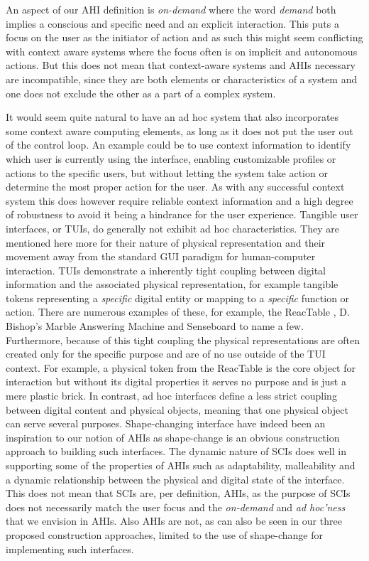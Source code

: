 An aspect of our AHI definition is \emph{on-demand} where the word \emph{demand} both implies a conscious and specific need and an explicit interaction.
This puts a focus on the user as the initiator of action and as such this might seem conflicting with context aware systems where the focus often is on implicit and autonomous actions.
But this does not mean that context-aware systems and AHIs necessary are incompatible, since they are both elements or characteristics of a system and one does not exclude the other as a part of a complex system.

It would seem quite natural to have an ad hoc system that also incorporates some context aware computing elements, as long as it does not put the user out of the control loop.
An example could be to use context information to identify which user is currently using the interface, enabling customizable profiles or actions to the specific users, but without letting the system take action or determine the most proper action for the user.
As with any successful context system this does however require reliable context information and a high degree of robustness to avoid it being a hindrance for the user experience.
\blank
Tangible user interfaces, or TUIs, do generally not exhibit ad hoc characteristics. 
They are mentioned here more for their nature of physical representation and their movement away from the standard GUI paradigm for human-computer interaction.
TUIs demonstrate a inherently tight coupling between digital information and the associated physical representation, for example tangible tokens representing a \emph{specific} digital entity or mapping to a \emph{specific} function or action.
There are numerous examples of these, for example, the ReacTable \cite{jorda2007reactable}, D. Bishop's Marble Answering Machine and Senseboard \cite{jacob2002tangible} to name a few.
Furthermore, because of this tight coupling the physical representations are often created only for the specific purpose and are of no use outside of the TUI context. 
For example, a physical token from the ReacTable is the core object for interaction but without its digital properties it serves no purpose and is just a mere plastic brick.
In contrast, ad hoc interfaces define a less strict coupling between digital content and physical objects, meaning that one physical object can serve several purposes.
\blank
Shape-changing interface have indeed been an inspiration to our notion of AHIs as shape-change is an obvious construction approach to building such interfaces.
The dynamic nature of SCIs does well in supporting some of the properties of AHIs such as adaptability, malleability and a dynamic relationship between the physical and digital state of the interface.
This does not mean that SCIs are, per definition, AHIs, as the purpose of SCIs does not necessarily match the user focus and the \emph{on-demand} and \emph{ad hoc'ness} that we envision in AHIs.
Also AHIs are not, as can also be seen in our three proposed construction approaches, limited to the use of shape-change for implementing such interfaces. 

